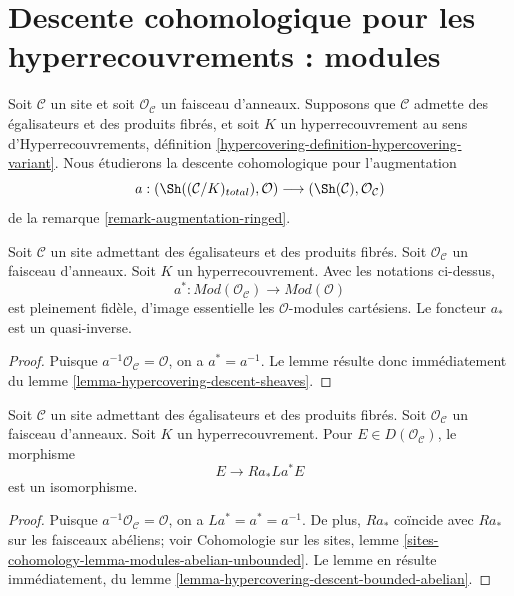 \section{Descente cohomologique pour les hyperrecouvrements : modules}
\label{section-cohomological-descent-hypercoverings-modules}

\noindent
Soit $\mathcal{C}$ un site et soit $\mathcal{O}_\mathcal{C}$
un faisceau d'anneaux. Supposons que $\mathcal{C}$
admette des égalisateurs et des produits fibrés, et soit $K$ un hyperrecouvrement
au sens d'Hyperrecouvrements, définition
\ref{hypercovering-definition-hypercovering-variant}. Nous étudierons la descente cohomologique
pour l'augmentation
$$
a :
(\Sh((\mathcal{C}/K)_{total}), \mathcal{O})
\longrightarrow
(\Sh(\mathcal{C}), \mathcal{O}_\mathcal{C})
$$
de la remarque \ref{remark-augmentation-ringed}.

\begin{lemma}
\label{lemma-hypercovering-descent-modules}
Soit $\mathcal{C}$ un site admettant des égalisateurs et des produits fibrés.
Soit $\mathcal{O}_\mathcal{C}$ un faisceau d'anneaux.
Soit $K$ un hyperrecouvrement. Avec les notations ci-dessus,
$$
a^* : \textit{Mod}(\mathcal{O}_\mathcal{C}) \to \textit{Mod}(\mathcal{O})
$$
est pleinement fidèle, d'image essentielle les $\mathcal{O}$-modules cartésiens.
Le foncteur $a_*$ est un quasi-inverse.
\end{lemma}

\begin{proof}
Puisque $a^{-1}\mathcal{O}_\mathcal{C} = \mathcal{O}$, on a
$a^* = a^{-1}$. Le lemme résulte donc immédiatement
du lemme \ref{lemma-hypercovering-descent-sheaves}.
\end{proof}

\begin{lemma}
\label{lemma-hypercovering-descent-bounded-modules}
Soit $\mathcal{C}$ un site admettant des égalisateurs et des produits fibrés.
Soit $\mathcal{O}_\mathcal{C}$ un faisceau d'anneaux.
Soit $K$ un hyperrecouvrement. Pour
$E \in D(\mathcal{O}_\mathcal{C})$, le morphisme
$$
E \longrightarrow Ra_*La^*E
$$
est un isomorphisme.
\end{lemma}

\begin{proof}
Puisque $a^{-1}\mathcal{O}_\mathcal{C} = \mathcal{O}$, on a
$La^* = a^* = a^{-1}$. De plus, $Ra_*$ coïncide avec
$Ra_*$ sur les faisceaux abéliens; voir Cohomologie
sur les sites, lemme
\ref{sites-cohomology-lemma-modules-abelian-unbounded}.
Le lemme en résulte immédiatement,
du lemme \ref{lemma-hypercovering-descent-bounded-abelian}.
\end{proof}

